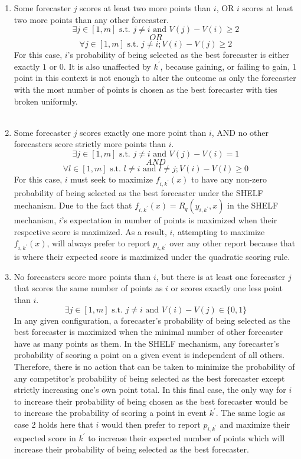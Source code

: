 \documentclass[letterpaper,12pt]{article}
\newcommand{\1}{\mathbbm{1}}
\begin{document}
\begin{enumerate}
    \item Some forecaster $j$ scores at least two more points than $i$, OR $i$ scores at least two more points than any other forecaster.\\
    $$\exists j \in [1,m] \text{ s.t. } j \ne i \text{ and } V(j) - V(i) \geq 2$$ 
    $$OR$$
    $$\forall j \in [1,m] \text{ s.t. } j \ne i; V(i) - V(j) \geq 2$$
    For this case, $i$'s probability of being selected as the best forecaster is either exactly $1$ or $0$. It is also unaffected by $k^\prime$, because gaining, or failing to gain, $1$ point in this context is not enough to alter the outcome as only the forecaster with the most number of points is chosen as the best forecaster with ties broken uniformly.\\\\
    
    \item Some forecaster $j$ scores exactly one more point than $i$, AND no other forecasters score strictly more points than $i$.\\
    $$\exists j \in [1,m] \text{ s.t. } j \neq i \text{ and } V(j) - V(i) = 1$$
    $$AND$$
    $$\forall l \in [1,m] \text{ s.t. } l \neq i \text{ and } l \neq j; V(i) - V(l) \geq 0$$
    For this case, $i$ must seek to maximize $f_{i, k^\prime}(x)$ to have any non-zero probability of being selected as the best forecaster under the SHELF mechanism. Due to the fact that $f_{i, k^\prime}(x) = R_q(y_{i,k^\prime}, x)$ in the SHELF mechanism, $i$'s expectation in number of points is maximized when their respective score is maximized. As a result, $i$, attempting to maximize $f_{i, k^\prime}(x)$, will always prefer to report $p_{i,k^\prime}$ over any other report because that is where their expected score is maximized under the quadratic scoring rule. 
    
    \item No forecasters score more points than $i$, but there is at least one forecaster $j$ that scores the same number of points as $i$ or scores exactly one less point than $i$.
    $$\exists j \in [1,m] \text{ s.t. } j \ne i \text{ and } V(i) - V(j) \in \{0,1\}$$
    In any given configuration, a forecaster's probability of being selected as the best forecaster is maximized when the minimal number of other forecaster have as many points as them. In the SHELF mechanism, any forecaster's probability of scoring a point on a given event is independent of all others. Therefore, there is no action that can be taken to minimize the probability of any competitor's probability of being selected as the best forecaster except strictly increasing one's own point total. In this final case, the only way for $i$ to increase their probability of being chosen as the best forecaster would be to increase the probability of scoring a point in event $k^\prime$. The same logic as case 2 holds here that $i$ would then prefer to report $p_{i,k^\prime}$ and maximize their expected score in $k^\prime$ to increase their expected number of points which will increase their probability of being selected as the best forecaster.
\end{enumerate}
\end{document}
